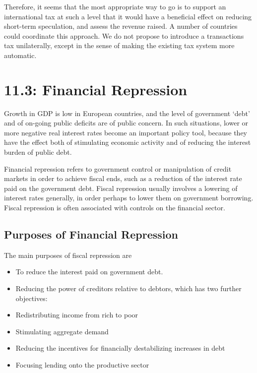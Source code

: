 \documentclass[]{tufte-handout}
\providecommand{\tightlist}{%
  \setlength{\itemsep}{0pt}\setlength{\parskip}{0pt}}
\begin{document}
Therefore, it seems that the most appropriate way to go is to support an
international tax at such a level that it would have a beneficial effect
on reducing short-term speculation, and assess the revenue raised. A
number of countries could coordinate this approach. We do not propose to
introduce a transactions tax unilaterally, except in the sense of making
the existing tax system more automatic.

\hypertarget{financial-repression}{%
\section{11.3: Financial Repression}\label{financial-repression}}

Growth in GDP is low in European countries, and the level of government
`debt' and of on-going public deficits are of public concern. In such
situations, lower or more negative real interest rates become an
important policy tool, because they have the effect both of stimulating
economic activity and of reducing the interest burden of public debt.

Financial repression refers to government control or manipulation of
credit markets in order to achieve fiscal ends, such as a reduction of
the interest rate paid on the government debt. Fiscal repression usually
involves a lowering of interest rates generally, in order perhaps to
lower them on government borrowing. Fiscal repression is often
associated with controls on the financial sector.

\hypertarget{purposes-of-financial-repression}{%
\subsection{Purposes of Financial
Repression}\label{purposes-of-financial-repression}}

The main purposes of fiscal repression are

\begin{itemize}
\tightlist
\item
  To reduce the interest paid on government debt.
\item
  Reducing the power of creditors relative to debtors, which has two
  further objectives:
\item
  Redistributing income from rich to poor
\item
  Stimulating aggregate demand
\item
  Reducing the incentives for financially destabilizing increases in
  debt
\item
  Focusing lending onto the productive sector
\end{itemize}
\end{document}
